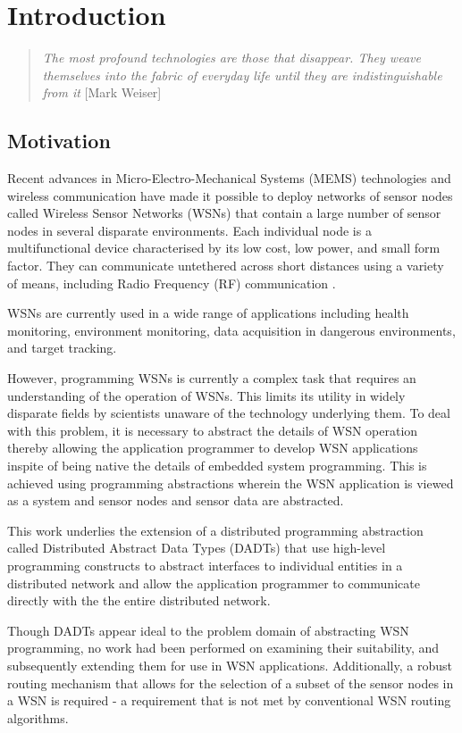 \chapter{Introduction} \label{chap:Intro}

\begin{quote}
\emph{The most profound technologies are those that disappear. They weave
themselves into the fabric of everyday life until they are indistinguishable
from it} [Mark Weiser]
\end{quote}

\section{Motivation}
Recent advances in Micro-Electro-Mechanical Systems (MEMS)
technologies and wireless communication have made it possible to deploy networks
of sensor nodes called Wireless Sensor Networks (WSNs) that contain a large
number of sensor nodes in several disparate environments. Each individual node is
a multifunctional device characterised by its low cost, low power, and small form
factor. They can communicate untethered across short distances using a variety of
means, including Radio Frequency (RF) communication
\cite{SensorSurveyAkyildiz:2002}.

WSNs are currently used in a wide range of applications including health
monitoring, environment monitoring, data acquisition in dangerous environments,
and target tracking.

However, programming WSNs is currently a complex task that requires an
understanding of the operation of WSNs. This limits its utility in widely
disparate fields by scientists unaware of the technology underlying them. To deal
with this problem, it is necessary to abstract the details of WSN operation
thereby allowing the application programmer to develop WSN applications inspite
of being native the details of embedded system programming. This is
achieved using programming abstractions wherein the WSN application is viewed as a system
and sensor nodes and sensor data are abstracted.

This work underlies the extension of a distributed programming abstraction called
Distributed Abstract Data Types (DADTs) \cite{migliavacca_DADT:2006} that use
high-level programming constructs to abstract interfaces to individual entities
in a distributed network and allow the application programmer to communicate
directly with the the entire distributed network.

Though DADTs appear ideal to the problem domain of abstracting WSN programming,
no work had been performed on examining their suitability, and subsequently
extending them for use in WSN applications. Additionally, a robust routing
mechanism that allows for the selection of a subset of the sensor nodes in a WSN
is required - a requirement that is not met by conventional WSN routing
algorithms.

